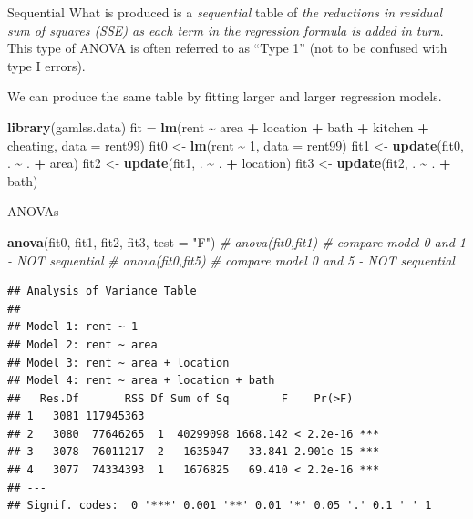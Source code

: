 \documentclass[
  ignorenonframetext,
]{beamer}
\newenvironment{Shaded}{\begin{snugshade}}{\end{snugshade}}
\newcommand{\AttributeTok}[1]{\textcolor[rgb]{0.13,0.29,0.53}{#1}}
\newcommand{\CommentTok}[1]{\textcolor[rgb]{0.56,0.35,0.01}{\textit{#1}}}
\newcommand{\DecValTok}[1]{\textcolor[rgb]{0.00,0.00,0.81}{#1}}
\newcommand{\FunctionTok}[1]{\textcolor[rgb]{0.13,0.29,0.53}{\textbf{#1}}}
\newcommand{\NormalTok}[1]{#1}
\newcommand{\OtherTok}[1]{\textcolor[rgb]{0.56,0.35,0.01}{#1}}
\newcommand{\SpecialCharTok}[1]{\textcolor[rgb]{0.81,0.36,0.00}{\textbf{#1}}}
\newcommand{\StringTok}[1]{\textcolor[rgb]{0.31,0.60,0.02}{#1}}
\begin{document}
\begin{frame}[fragile]{Sequential}
\label{sequential}
What is produced is a \emph{sequential} table of \emph{the reductions in
residual sum of squares (SSE) as each term in the regression formula is
added in turn}. This type of ANOVA is often referred to as ``Type 1''
(not to be confused with type I errors).

We can produce the same table by fitting larger and larger regression
models.

\begin{Shaded}
\begin{Highlighting}[]
\FunctionTok{library}\NormalTok{(gamlss.data)}
\NormalTok{fit }\OtherTok{=} \FunctionTok{lm}\NormalTok{(rent }\SpecialCharTok{\textasciitilde{}}\NormalTok{ area }\SpecialCharTok{+}\NormalTok{ location }\SpecialCharTok{+}\NormalTok{ bath }\SpecialCharTok{+}\NormalTok{ kitchen }\SpecialCharTok{+}\NormalTok{ cheating, }\AttributeTok{data =}\NormalTok{ rent99)}
\NormalTok{fit0 }\OtherTok{\textless{}{-}} \FunctionTok{lm}\NormalTok{(rent }\SpecialCharTok{\textasciitilde{}} \DecValTok{1}\NormalTok{, }\AttributeTok{data =}\NormalTok{ rent99)}
\NormalTok{fit1 }\OtherTok{\textless{}{-}} \FunctionTok{update}\NormalTok{(fit0, . }\SpecialCharTok{\textasciitilde{}}\NormalTok{ . }\SpecialCharTok{+}\NormalTok{ area)}
\NormalTok{fit2 }\OtherTok{\textless{}{-}} \FunctionTok{update}\NormalTok{(fit1, . }\SpecialCharTok{\textasciitilde{}}\NormalTok{ . }\SpecialCharTok{+}\NormalTok{ location)}
\NormalTok{fit3 }\OtherTok{\textless{}{-}} \FunctionTok{update}\NormalTok{(fit2, . }\SpecialCharTok{\textasciitilde{}}\NormalTok{ . }\SpecialCharTok{+}\NormalTok{ bath)}
\end{Highlighting}
\end{Shaded}
\end{frame}

\begin{frame}[fragile]{ANOVAs}
\label{anovas}
\begin{Shaded}
\begin{Highlighting}[]
\FunctionTok{anova}\NormalTok{(fit0, fit1, fit2, fit3, }\AttributeTok{test =} \StringTok{"F"}\NormalTok{)}
\CommentTok{\# anova(fit0,fit1) \# compare model 0 and 1 {-} NOT sequential}
\CommentTok{\# anova(fit0,fit5) \# compare model 0 and 5 {-} NOT sequential}
\end{Highlighting}
\end{Shaded}

\begin{verbatim}
## Analysis of Variance Table
## 
## Model 1: rent ~ 1
## Model 2: rent ~ area
## Model 3: rent ~ area + location
## Model 4: rent ~ area + location + bath
##   Res.Df       RSS Df Sum of Sq        F    Pr(>F)    
## 1   3081 117945363                                    
## 2   3080  77646265  1  40299098 1668.142 < 2.2e-16 ***
## 3   3078  76011217  2   1635047   33.841 2.901e-15 ***
## 4   3077  74334393  1   1676825   69.410 < 2.2e-16 ***
## ---
## Signif. codes:  0 '***' 0.001 '**' 0.01 '*' 0.05 '.' 0.1 ' ' 1
\end{verbatim}
\end{frame}
\end{document}

